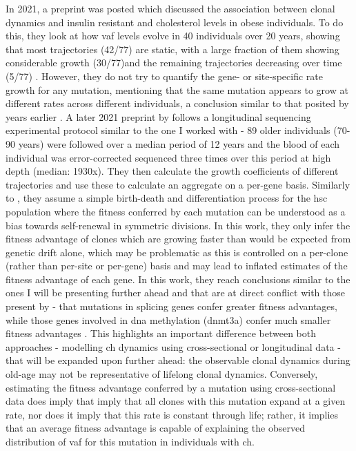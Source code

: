 In 2021, a preprint was posted which discussed the association between clonal dynamics and insulin resistant and cholesterol levels in obese individuals. To do this, they look at how \ac{vaf} levels evolve in 40 individuals over 20 years, showing that most trajectories (42/77) are static, with a large fraction of them showing considerable growth (30/77)and the remaining trajectories decreasing over time (5/77) \cite{Van_Deuren2021-ll}. However, they do not try to quantify the gene- or site-specific rate growth for any mutation, mentioning that the same mutation appears to grow at different rates across different individuals, a conclusion similar to that posited by  years earlier \cite{Young2016-du}. A later 2021 preprint by  follows a longitudinal sequencing experimental protocol similar to the one I worked with - 89 older individuals (70-90 years) were followed over a median period of 12 years and the blood of each individual was error-corrected sequenced three times over this period at high depth (median: 1930x). They then calculate the growth coefficients of different trajectories and use these to calculate an aggregate on a per-gene basis. Similarly to \cite{Watson2020-pz}, they assume a simple birth-death and differentiation process for the \ac{hsc} population where the fitness conferred by each mutation can be understood as a bias towards self-renewal in symmetric divisions. In this work, they only infer the fitness advantage of clones which are growing faster than would be expected from genetic drift alone, which may be problematic as this is controlled on a per-clone (rather than per-site or per-gene) basis and may lead to inflated estimates of the fitness advantage of each gene. In this work, they reach conclusions similar to the ones I will be presenting further ahead and that are at direct conflict with those present by \cite{Watson2020-pz} - that mutations in splicing genes confer greater fitness advantages, while those genes involved in \ac{dna} methylation (\ac{dnmt3a}) confer much smaller fitness advantages \cite{Robertson2021-sw}. This highlights an important difference between both approaches - modelling \ac{ch} dynamics using cross-sectional or longitudinal data - that will be expanded upon further ahead: the observable clonal dynamics during old-age may not be representative of lifelong clonal dynamics. Conversely, estimating the fitness advantage conferred by a mutation using cross-sectional data does imply that imply that all clones with this mutation expand at a given rate, nor does it imply that this rate is constant through life; rather, it implies that an average fitness advantage is capable of explaining the observed distribution of \ac{vaf} for this mutation in individuals with \ac{ch}.

